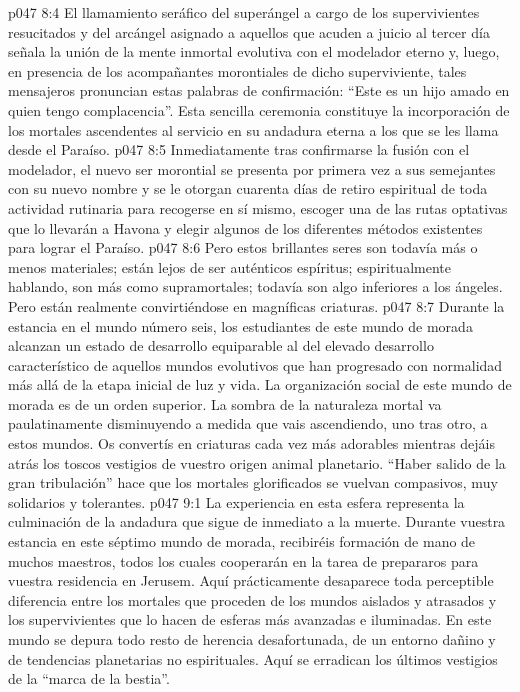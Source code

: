\vs p047 8:4 \pc El llamamiento seráfico del superángel a cargo de los supervivientes resucitados y del arcángel asignado a aquellos que acuden a juicio al tercer día señala la unión de la mente inmortal evolutiva con el modelador eterno y, luego, en presencia de los acompañantes morontiales de dicho superviviente, tales mensajeros pronuncian estas palabras de confirmación: “Este es un hijo amado en quien tengo complacencia”. Esta sencilla ceremonia constituye la incorporación de los mortales ascendentes al servicio en su andadura eterna a los que se les llama desde el Paraíso.
\vs p047 8:5 Inmediatamente tras confirmarse la fusión con el modelador, el nuevo ser morontial se presenta por primera vez a sus semejantes con su nuevo nombre y se le otorgan cuarenta días de retiro espiritual de toda actividad rutinaria para recogerse en sí mismo, escoger una de las rutas optativas que lo llevarán a Havona y elegir algunos de los diferentes métodos existentes para lograr el Paraíso.
\vs p047 8:6 \pc Pero estos brillantes seres son todavía más o menos materiales; están lejos de ser auténticos espíritus; espiritualmente hablando, son más como supramortales; todavía son algo inferiores a los ángeles. Pero están realmente convirtiéndose en magníficas criaturas.
\vs p047 8:7 Durante la estancia en el mundo número seis, los estudiantes de este mundo de morada alcanzan un estado de desarrollo equiparable al del elevado desarrollo característico de aquellos mundos evolutivos que han progresado con normalidad más allá de la etapa inicial de luz y vida. La organización social de este mundo de morada es de un orden superior. La sombra de la naturaleza mortal va paulatinamente disminuyendo a medida que vais ascendiendo, uno tras otro, a estos mundos. Os convertís en criaturas cada vez más adorables mientras dejáis atrás los toscos vestigios de vuestro origen animal planetario. “Haber salido de la gran tribulación” hace que los mortales glorificados se vuelvan compasivos, muy solidarios y tolerantes.
\vs p047 9:1 La experiencia en esta esfera representa la culminación de la andadura que sigue de inmediato a la muerte. Durante vuestra estancia en este séptimo mundo de morada, recibiréis formación de mano de muchos maestros, todos los cuales cooperarán en la tarea de prepararos para vuestra residencia en Jerusem. Aquí prácticamente desaparece toda perceptible diferencia entre los mortales que proceden de los mundos aislados y atrasados y los supervivientes que lo hacen de esferas más avanzadas e iluminadas. En este mundo se depura todo resto de herencia desafortunada, de un entorno dañino y de tendencias planetarias no espirituales. Aquí se erradican los últimos vestigios de la “marca de la bestia”.
